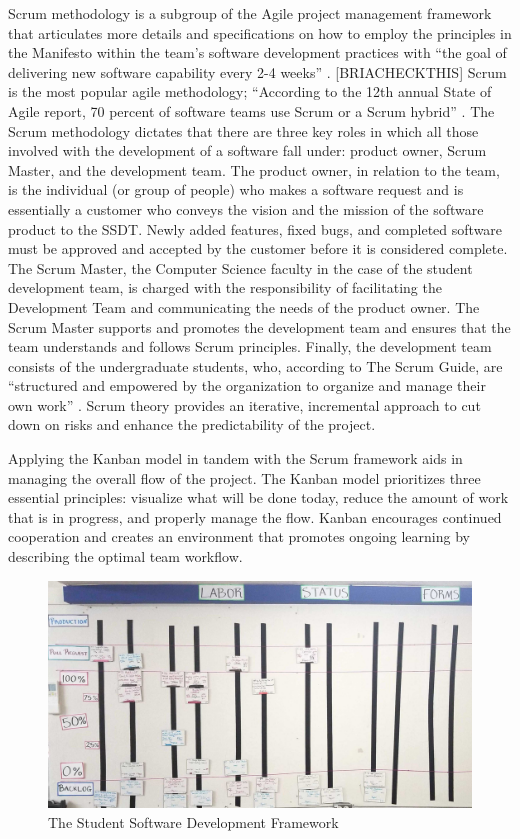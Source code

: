 Scrum methodology is a subgroup of the Agile project management framework that articulates more details and specifications on how to employ the principles in the Manifesto within the team's software development practices with ``the goal of delivering new software capability every 2-4 weeks'' \cite{thescrumguide}. [BRIACHECKTHIS] Scrum is the most popular agile methodology; ``According to the 12th annual State of Agile report, 70 percent of software teams use Scrum or a Scrum hybrid'' \cite{}. The Scrum methodology dictates that there are three key roles in which all those involved with the development of a software fall under: product owner, Scrum Master, and the development team. The product owner, in relation to the team, is the individual (or group of people) who makes a software request and is essentially a customer who conveys the vision and the mission of the software product to the SSDT. Newly added features, fixed bugs, and completed software must be approved and accepted by the customer before it is considered complete. The Scrum Master, the Computer Science faculty in the case of the student development team, is charged with the responsibility of facilitating the Development Team and communicating the needs of the product owner. The Scrum Master supports and promotes the development team and ensures that the team understands and follows Scrum principles. Finally, the development team consists of the undergraduate students, who, according to The Scrum Guide, are ``structured and empowered by the organization to organize and manage their own work'' \cite{}. Scrum theory provides an iterative, incremental approach to cut down on risks and enhance the predictability of the project. 

Applying the Kanban model \cite{} in tandem with the Scrum framework aids in managing the overall flow of the project. The Kanban model prioritizes three essential principles: visualize what will be done today, reduce the amount of work that is in progress, and properly manage the flow. Kanban encourages continued cooperation and creates an environment that promotes ongoing learning by describing the optimal team workflow.

\begin{figure}[h]
  \centering
  \includegraphics[width=\linewidth]{kanban.jpg}
  \caption{The Student Software Development Framework}
\end{figure}

